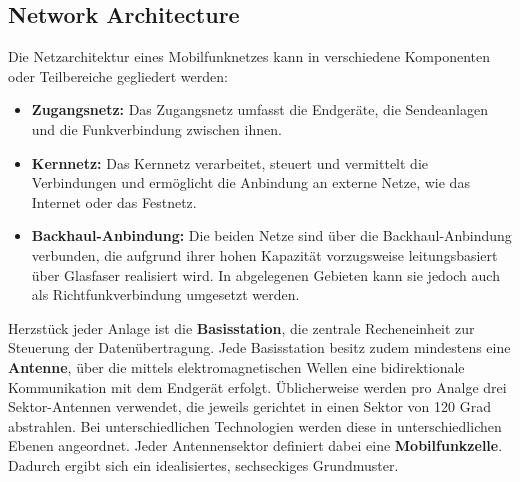 \subsection{Network Architecture}
\begin{German}
    Die Netzarchitektur eines Mobilfunknetzes kann in verschiedene Komponenten oder Teilbereiche gegliedert werden:

    \begin{itemize}
        \item \textbf{Zugangsnetz:} Das Zugangsnetz umfasst die Endgeräte, die Sendeanlagen und die Funkverbindung zwischen ihnen.
        \item \textbf{Kernnetz:} Das Kernnetz verarbeitet, steuert und vermittelt die Verbindungen und ermöglicht die Anbindung an externe Netze, wie das Internet oder das Festnetz. \cite{behnkeGrundkursMobilfunkUnd2022}
        \item \textbf{Backhaul-Anbindung:} Die beiden Netze sind über die Backhaul-Anbindung verbunden, die aufgrund ihrer hohen Kapazität vorzugsweise leitungsbasiert über Glasfaser realisiert wird. In abgelegenen Gebieten kann sie jedoch auch als Richtfunkverbindung umgesetzt werden.
    \end{itemize}

    Herzstück jeder Anlage ist die \textbf{Basisstation}, die zentrale Recheneinheit zur Steuerung der Datenübertragung.  Jede Basisstation besitz zudem mindestens eine \textbf{Antenne}, über die mittels elektromagnetischen Wellen eine bidirektionale Kommunikation mit dem Endgerät erfolgt. Üblicherweise werden pro Analge drei Sektor-Antennen verwendet, die jeweils gerichtet in einen Sektor von 120 Grad abstrahlen. Bei unterschiedlichen Technologien werden diese in unterschiedlichen Ebenen angeordnet. Jeder Antennensektor definiert dabei eine \textbf{Mobilfunkzelle}. Dadurch ergibt sich ein idealisiertes, sechseckiges Grundmuster. \cite{behnkeGrundkursMobilfunkUnd2022}
\end{German}

